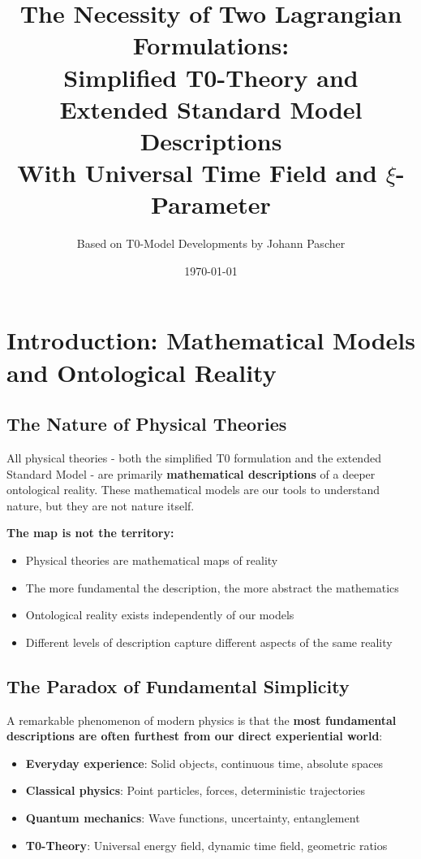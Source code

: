 \documentclass[12pt,a4paper]{article}
\title{The Necessity of Two Lagrangian Formulations:\\
	Simplified T0-Theory and Extended Standard Model Descriptions\\
	\large With Universal Time Field and $\xi$-Parameter}
\author{Based on T0-Model Developments by Johann Pascher}
\date{\today}
\begin{document}
	
	\maketitle
	
	\section{Introduction: Mathematical Models and Ontological Reality}
	
	\subsection{The Nature of Physical Theories}
	
	All physical theories - both the simplified T0 formulation and the extended Standard Model - are primarily \textbf{mathematical descriptions} of a deeper ontological reality. These mathematical models are our tools to understand nature, but they are not nature itself.
	
	\begin{tcolorbox}[colback=gray!5!white,colframe=gray!75!black,title=Fundamental Epistemological Insight]
		\textbf{The map is not the territory:}
		\begin{itemize}
			\item Physical theories are mathematical maps of reality
			\item The more fundamental the description, the more abstract the mathematics
			\item Ontological reality exists independently of our models
			\item Different levels of description capture different aspects of the same reality
		\end{itemize}
	\end{tcolorbox}
	
	\subsection{The Paradox of Fundamental Simplicity}
	
	A remarkable phenomenon of modern physics is that the \textbf{most fundamental descriptions are often furthest from our direct experiential world}:
	
	\begin{itemize}
		\item \textbf{Everyday experience}: Solid objects, continuous time, absolute spaces
		\item \textbf{Classical physics}: Point particles, forces, deterministic trajectories
		\item \textbf{Quantum mechanics}: Wave functions, uncertainty, entanglement
		\item \textbf{T0-Theory}: Universal energy field, dynamic time field, geometric ratios
	\end{itemize}
	
\end{document}
